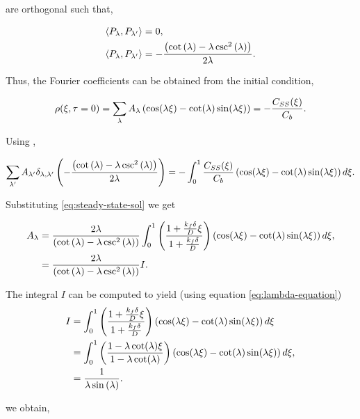 are orthogonal such that,

\begin{align}
	\left< P_\lambda , P_{\lambda'}\right> &= 0, \\
	\left< P_\lambda , P_{\lambda'}\right> &= -\frac{\left({\cot\left({\lambda}\right) -  \lambda \csc^2\left({\lambda}\right)}\right)}{2\lambda}.
\end{align}

Thus, the Fourier coefficients can be obtained from the initial condition,
 

\begin{align}
	\rho(\xi,\tau = 0) = \sum_\lambda A_\lambda \left({  \cos(\lambda\xi) - \cot(\lambda)\sin(\lambda\xi)}\right) = -\frac{C_{SS}(\xi)}{C_b}.
\end{align}


Using \label{eq:orthogonality}, 

\begin{align}
\sum_{\lambda'} A_{\lambda'} \delta_{\lambda, \lambda'}\left({-\frac{\left({\cot\left({\lambda}\right) -  \lambda \csc^2\left({\lambda}\right)}\right)}{2\lambda} }\right)= -\int_0^1 \frac{C_{SS}(\xi)}{C_b}\left({\cos(\lambda \xi) - \cot(\lambda) \sin(\lambda\xi)}\right)d\xi.
\end{align}




Substituting \ref{eq:steady-state-sol} we get

\begin{align}
A_{\lambda} &= \frac{2\lambda}{\left({\cot\left({\lambda}\right) -  \lambda \csc^2\left({\lambda}\right)}\right)}\int_0^1 \left({\frac{1+\frac{k_f\delta}{D}\xi}{1+\frac{k_f\delta}{D}}}\right)\left({\cos(\lambda \xi) - \cot(\lambda) \sin(\lambda\xi)}\right)d\xi,\\
&= \frac{2\lambda}{\left({\cot\left({\lambda}\right) -  \lambda \csc^2\left({\lambda}\right)}\right)}I.
\end{align}

  
The integral $I$ can be computed to yield (using equation \ref{eq:lambda-equation})
\begin{align}
I &= \int_0^1 \left({\frac{1+\frac{k_f\delta}{D}\xi}{1+\frac{k_f\delta}{D}}}\right)\left({\cos(\lambda \xi) - \cot(\lambda) \sin(\lambda\xi)}\right)d\xi\\
&= \int_0^1 \left({\frac{1-\lambda \cot(\lambda)\xi}{1-\lambda \cot(\lambda)}}\right)\left({\cos(\lambda \xi) - \cot(\lambda) \sin(\lambda\xi)}\right)d\xi,\\
&= \frac{1}{\lambda\sin\left({\lambda}\right)}.
\end{align}

 we obtain,



